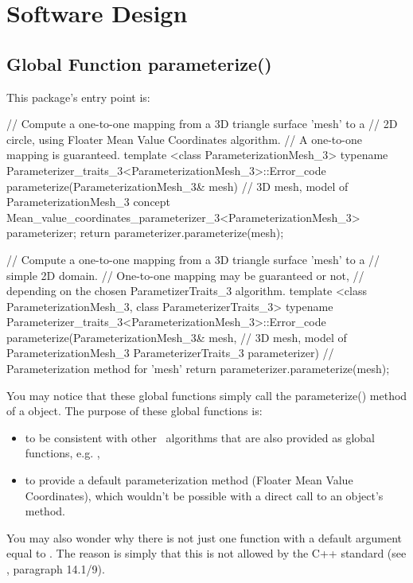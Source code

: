 \section{Software Design}

\subsection{Global Function parameterize()}

This package's entry point is:

\begin{ccExampleCode}
// Compute a one-to-one mapping from a 3D triangle surface 'mesh' to a
// 2D circle, using Floater Mean Value Coordinates algorithm.
// A one-to-one mapping is guaranteed.
template <class ParameterizationMesh_3>
typename Parameterizer_traits_3<ParameterizationMesh_3>::Error_code
parameterize(ParameterizationMesh_3& mesh)  // 3D mesh, model of ParameterizationMesh_3 concept
{
    Mean_value_coordinates_parameterizer_3<ParameterizationMesh_3> parameterizer;
    return parameterizer.parameterize(mesh);
}


// Compute a one-to-one mapping from a 3D triangle surface 'mesh' to a
// simple 2D domain.
// One-to-one mapping may be guaranteed or not,
// depending on the chosen ParametizerTraits_3 algorithm.
template <class ParameterizationMesh_3, class ParameterizerTraits_3>
typename Parameterizer_traits_3<ParameterizationMesh_3>::Error_code
parameterize(ParameterizationMesh_3& mesh,          // 3D mesh, model of ParameterizationMesh_3
             ParameterizerTraits_3 parameterizer)   // Parameterization method for 'mesh'
{
    return parameterizer.parameterize(mesh);
}
\end{ccExampleCode}

You may notice that these global functions simply call the
parameterize() method of a  object.
The purpose of these global functions is:
\begin{itemize}
\item to be consistent with other \cgal\ algorithms that are also provided as
      global functions, e.g. ,
\item to provide a default parameterization method (Floater Mean Value Coordinates),
      which wouldn't be possible with a direct call to an object's method.
\end{itemize}

You may also wonder why there is not just one  function 
with a default  argument equal to
.
The reason is simply that this is not allowed by the C++ standard (see
\cite{cgal:ansi-is14882-98}, paragraph 14.1/9).


